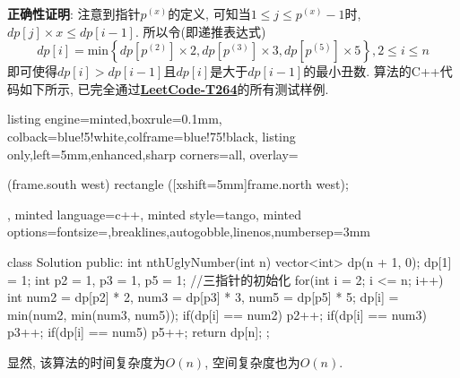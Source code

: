 \documentclass{article}
\begin{document}
\begin{homeworkProblem}
	\textbf{正确性证明}: 注意到指针$p^{(x)}$的定义, 可知当$1\leq j\leq p^{(x)}-1$时, $dp[j]\times x\leq dp[i-1]$. 所以令(即递推表达式)
	$$
	dp\left[ i \right] =\text{min} \left\{ dp\left[ p^{\left( 2 \right)} \right] \times 2,dp\left[ p^{\left( 3 \right)} \right] \times 3,dp\left[ p^{\left( 5 \right)} \right] \times 5 \right\} ,2\le i\le n
	$$
	即可使得$dp[i]>dp[i-1]$且$dp[i]$是大于$dp[i-1]$的最小丑数. 算法的C++代码如下所示, 已完全通过\href{https://leetcode.cn/problems/ugly-number-ii/description/}{\textbf{LeetCode-T264}}的所有测试样例.
\begin{tcblisting}{listing engine=minted,boxrule=0.1mm,
colback=blue!5!white,colframe=blue!75!black,
listing only,left=5mm,enhanced,sharp corners=all,
overlay={\begin{tcbclipinterior} (frame.south west)
rectangle ([xshift=5mm]frame.north west);\end{tcbclipinterior}},
minted language=c++,
minted style=tango,
minted options={fontsize=\small,breaklines,autogobble,linenos,numbersep=3mm}}
class Solution {
public:
    int nthUglyNumber(int n) {
        vector<int> dp(n + 1, 0);
        dp[1] = 1;
        int p2 = 1, p3 = 1, p5 = 1;  //三指针的初始化
        for(int i = 2; i <= n; i++) {
            int num2 = dp[p2] * 2, num3 = dp[p3] * 3, num5 = dp[p5] * 5;
            dp[i] = min(num2, min(num3, num5));
            if(dp[i] == num2) {
                p2++;
            }
            if(dp[i] == num3) {
                p3++;
            }
            if(dp[i] == num5) {
                p5++;
            }
        }
        return dp[n];
    }
};
\end{tcblisting}
	显然, 该算法的时间复杂度为$O(n)$, 空间复杂度也为$O(n)$.
\end{homeworkProblem}

\pagebreak
\end{document}
